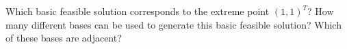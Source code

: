 Which basic feasible solution corresponds to the extreme point $(1, 1)^T$? How many different bases can be used to 
generate this basic feasible solution? Which of these bases are adjacent?

\begin{solution}
  \ \\
  \vfill
  \ \\
\end{solution}